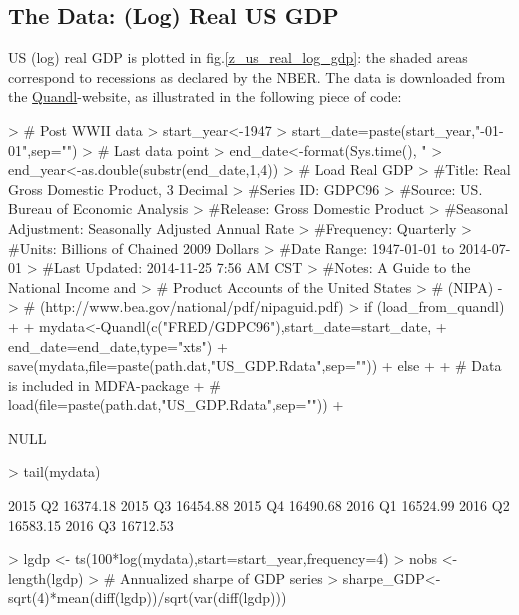 \documentclass[a4paper]{book}
\begin{document}
\subsection{The Data: (Log) Real US GDP}

US (log) real GDP is plotted in fig.\ref{z_us_real_log_gdp}: the shaded areas correspond to recessions as declared by the NBER. The data is downloaded from the \href{https://www.quandl.com}{Quandl}-website, as illustrated in the following piece of code:
\begin{Schunk}
\begin{Sinput}
> # Post WWII data
> start_year<-1947 
> start_date=paste(start_year,"-01-01",sep="")
> # Last data point
> end_date<-format(Sys.time(), "%
> end_year<-as.double(substr(end_date,1,4))
> # Load Real GDP
> #Title:               Real Gross Domestic Product, 3 Decimal
> #Series ID:           GDPC96
> #Source:              US. Bureau of Economic Analysis
> #Release:             Gross Domestic Product
> #Seasonal Adjustment: Seasonally Adjusted Annual Rate
> #Frequency:           Quarterly
> #Units:               Billions of Chained 2009 Dollars
> #Date Range:          1947-01-01 to 2014-07-01
> #Last Updated:        2014-11-25 7:56 AM CST
> #Notes:               A Guide to the National Income and 
> #                     Product Accounts of the United States 
> #                     (NIPA) - 
> #   (http://www.bea.gov/national/pdf/nipaguid.pdf)
> if (load_from_quandl)
+ {
+   mydata<-Quandl(c("FRED/GDPC96"),start_date=start_date,
+                end_date=end_date,type="xts")
+   save(mydata,file=paste(path.dat,"US_GDP.Rdata",sep=""))
+ } else
+ {
+ # Data is included in MDFA-package  
+ #  load(file=paste(path.dat,"US_GDP.Rdata",sep=""))
+ }
\end{Sinput}
\begin{Soutput}
NULL
\end{Soutput}
\begin{Sinput}
> tail(mydata)
\end{Sinput}
\begin{Soutput}
            [,1]
2015 Q2 16374.18
2015 Q3 16454.88
2015 Q4 16490.68
2016 Q1 16524.99
2016 Q2 16583.15
2016 Q3 16712.53
\end{Soutput}
\begin{Sinput}
> lgdp <- ts(100*log(mydata),start=start_year,frequency=4)
> nobs <- length(lgdp)
> # Annualized sharpe of GDP series
> sharpe_GDP<-sqrt(4)*mean(diff(lgdp))/sqrt(var(diff(lgdp)))
\end{Sinput}
\end{Schunk}
\end{document}
